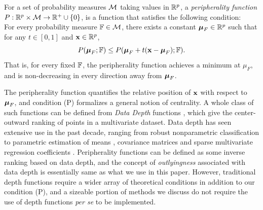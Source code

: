 \begin{Definition}\label{defn:peripherality}
For a set of probability measures $\mathcal{M}$ taking values in ${\mathbb{R}}^p$, a {\it peripherality function} $ P : {\mathbb{R}}^p \times \mathcal{M} \rightarrow {\mathbb{R}}^+ \cup \{ 0\}$,  is a function that satisfies the following condition:\\

 For every probability measure ${\mathbb{F}} \in \mathcal{M}$, there exists a constant ${\boldsymbol{\mu}}_{F} \in {\mathbb{R}}^p$ such that for any $t \in [ 0, 1]$ and ${\bf{x}} \in {\mathbb{R}}^p$,
%
$$ 
P ( {\boldsymbol{\mu}}_{F} ; {\mathbb{F}} ) \leq P ( {\boldsymbol{\mu}}_{F} + t ( {\bf{x}} - {\boldsymbol{\mu}}_{F} ); {\mathbb{F}} ). 
$$ 
%
That is, for every fixed ${\mathbb{F}}$, the peripherality function achieves a minimum at $\mu_{F}$, and is non-decreasing in every direction away from ${\boldsymbol{\mu}}_{F}$.
\end{Definition}

The peripherality function quantifies the relative position of ${\bf{x}}$ with respect to ${\boldsymbol{\mu}}_{F}$, and condition (P) formalizes a general notion of centrality. A whole class of such functions can be defined from {\it Data Depth} functions \citep{zuo00}, which give the center-outward ranking of points in a multivariate dataset. Data depth has seen extensive use in the past decade, ranging from robust nonparametric classification \citep{jornsten04, ghosh05, dutta12, sguera14} to parametric estimation of means \citep{ZuoCuiHe04}, covariance matrices \citep{ZuoCui05} and sparse multivariate regression coefficients \citep{DuttaGenton17,MajumdarChatterjeeStat}. Peripherality functions can be defined as some inverse ranking based on data depth, and the concept of {\it outlyingness} associated with data depth is essentially same as what we use in this paper. However, traditional depth functions require a wider array of theoretical conditions \citep{zuo00} in addition to our condition (P), and a sizeable portion of methods we discuss do not require the use of depth functions {\it per se} to be implemented. %


